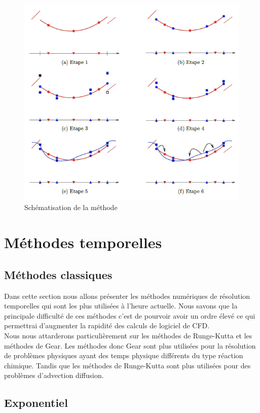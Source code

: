 \documentclass[a4paper,12pt]{report}
\theoremstyle{break}
\begin{document}
\begin{figure}[h]
\centering
   \includegraphics[scale=0.5]{images/Meth_spectrale.png}
  	\caption{Schématisation de la méthode} 
   \label{fig:meth_spectrale}
\end{figure}


\section{Méthodes temporelles}
\subsection{Méthodes classiques}

Dans cette section nous allons présenter les méthodes numériques de résolution temporelles qui sont les plus utilisées à l'heure actuelle. Nous savons que la principale difficulté de ces méthodes c'est de pourvoir avoir un ordre élevé ce qui permettrai d'augmenter la rapidité des calculs de logiciel de CFD. \\ 
Nous nous attarderons particulièrement sur les méthodes de Runge-Kutta et les méthodes de Gear. 
Les méthodes donc Gear sont plus utilisées pour la résolution de problèmes physiques ayant des temps physique différents du type réaction chimique. Tandis que les méthodes de Runge-Kutta sont plus utilisées pour des problèmes d'advection diffusion. 

\subsection{Exponentiel}
\end{document}
